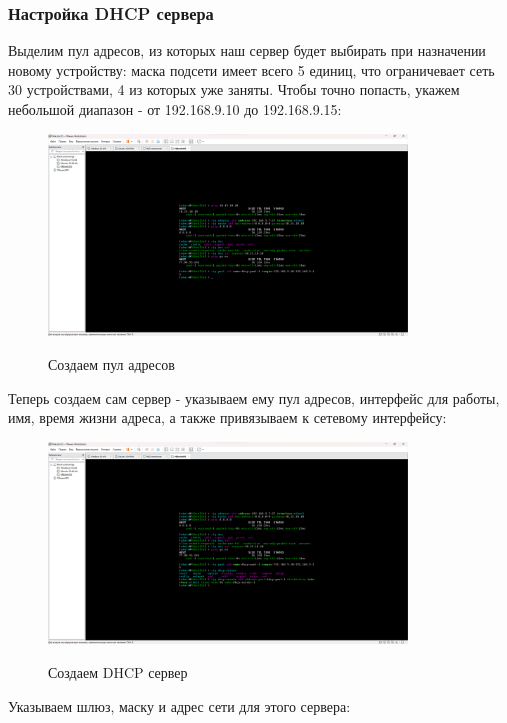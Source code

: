 \documentclass[a4paper]{article}
\begin{document}
  \subsubsection{Настройка DHCP сервера}
  
  Выделим пул адресов, из которых наш сервер будет выбирать при назначении новому устройству:
  маска подсети имеет всего 5 единиц, что ограничевает сеть 30 устройствами, 4 из которых уже заняты.
  Чтобы точно попасть, укажем небольшой диапазон - от 192.168.9.10 до 192.168.9.15:
  
  \begin{figure}[H]
    \centering
    \includegraphics[width=0.85\textwidth]{06_00 (100)}
    \label{img:100}
    \caption{Создаем пул адресов}
  \end{figure}
  
  Теперь создаем сам сервер - указываем ему пул адресов, интерфейс для работы, имя, время жизни
  адреса, а также привязываем к сетевому интерфейсу:

  \begin{figure}[H]
    \centering
    \includegraphics[width=0.85\textwidth]{06_00 (101)}
    \label{img:101}
    \caption{Создаем DHCP сервер}
  \end{figure}
  
  Указываем шлюз, маску и адрес сети для этого сервера:
\end{document}
